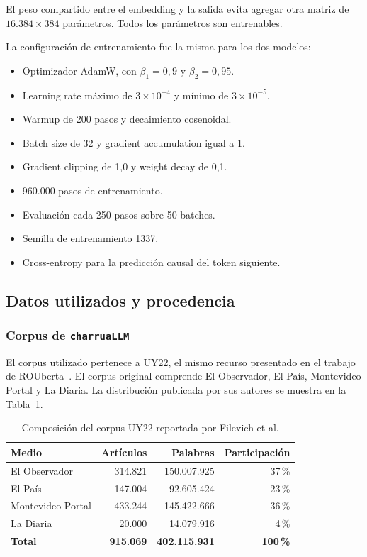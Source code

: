 \documentclass[11pt,a4paper]{article}
\newcommand{\charrua}{\texttt{charruaLLM}}
\begin{document}
El peso compartido entre el embedding y la salida evita agregar otra matriz de
$16.384 \times 384$ parámetros. Todos los parámetros son entrenables.

La configuración de entrenamiento fue la misma para los dos modelos:

\begin{itemize}
    \item Optimizador AdamW, con $\beta_1=0{,}9$ y $\beta_2=0{,}95$.
    \item Learning rate máximo de $3\times10^{-4}$ y mínimo de
          $3\times10^{-5}$.
    \item Warmup de 200 pasos y decaimiento cosenoidal.
    \item Batch size de 32 y gradient accumulation igual a 1.
    \item Gradient clipping de 1,0 y weight decay de 0,1.
    \item 960.000 pasos de entrenamiento.
    \item Evaluación cada 250 pasos sobre 50 batches.
    \item Semilla de entrenamiento 1337.
    \item Cross-entropy para la predicción causal del token siguiente.
\end{itemize}


\subsection{Datos utilizados y procedencia}

\subsubsection{Corpus de \charrua}

El corpus utilizado pertenece a UY22, el mismo recurso presentado en el trabajo
de ROUberta~\cite{filevich2024}. El corpus original comprende El Observador, El
País, Montevideo Portal y La Diaria. La distribución publicada por sus autores
se muestra en la Tabla~\ref{tab:uy22}.

\begin{table}[H]
    \centering
    \caption{Composición del corpus UY22 reportada por Filevich et al.}
    \label{tab:uy22}
    \begin{tabular}{lrrr}
        \toprule
        Medio & Artículos & Palabras & Participación \\
        \midrule
        El Observador & 314.821 & 150.007.925 & 37\,\% \\
        El País & 147.004 & 92.605.424 & 23\,\% \\
        Montevideo Portal & 433.244 & 145.422.666 & 36\,\% \\
        La Diaria & 20.000 & 14.079.916 & 4\,\% \\
        \midrule
        \textbf{Total} & \textbf{915.069} & \textbf{402.115.931} & \textbf{100\,\%} \\
        \bottomrule
    \end{tabular}
\end{table}
\end{document}
